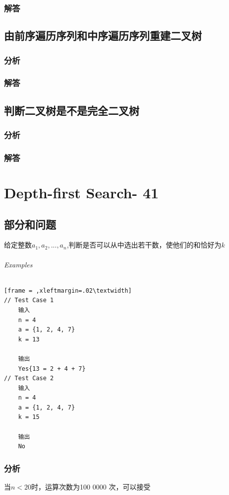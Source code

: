 \documentclass[UTF8,a4paper,12pt]{ctexbook}
\begin{document}
	\subsection{解答}
	
\section{由前序遍历序列和中序遍历序列重建二叉树}
	\subsection{分析}
	
	\subsection{解答}
	
\section{判断二叉树是不是完全二叉树}
	\subsection{分析}
	
	\subsection{解答}
	
\chapter{Depth-first Search- 41}
\section{部分和问题}
	给定整数$a_1, a_2,...,a_n$,判断是否可以从中选出若干数，使他们的和恰好为$k$
	\subparagraph{Examples}
		\begin{lstlisting}[frame = ,xleftmargin=.02\textwidth]
// Test Case 1
	输入
	n = 4
	a = {1, 2, 4, 7}
	k = 13
	
	输出
	Yes{13 = 2 + 4 + 7}
// Test Case 2
	输入
	n = 4
	a = {1, 2, 4, 7}
	k = 15
	
	输出
	No
		\end{lstlisting}
	\subsection{分析}
	
	当$n < 20$时，运算次数为100 0000 次，可以接受
\end{document}
